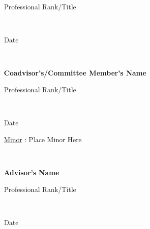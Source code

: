 \vspace{-.5cm}

\hspace{4.5cm} Professional Rank/Title

\vspace{-0.25cm}

\hspace{4.5cm} \hrulefill\

\vspace{-0.5cm}

\hspace{4.5cm}
Date

\hspace{4.5cm} \hrulefill\

\vspace{-0.5cm}

\hspace{4.5cm}
\textbf{Coadvisor's/Committee Member's Name}

\vspace{-.5cm}

\hspace{4.5cm} Professional Rank/Title

\vspace{-0.25cm}

\hspace{4.5cm} \hrulefill\

\vspace{-0.5cm}

\hspace{4.5cm}
Date

\underline{Minor} : Place Minor Here


\hspace{4.5cm} \hrulefill\

\vspace{-0.5cm}

\hspace{4.5cm} 
\textbf{Advisor's Name}

\vspace{-.5cm}

\hspace{4.5cm} Professional Rank/Title

\vspace{-0.25cm}

\hspace{4.5cm} \hrulefill\

\vspace{-0.5cm}

\hspace{4.5cm}
Date

